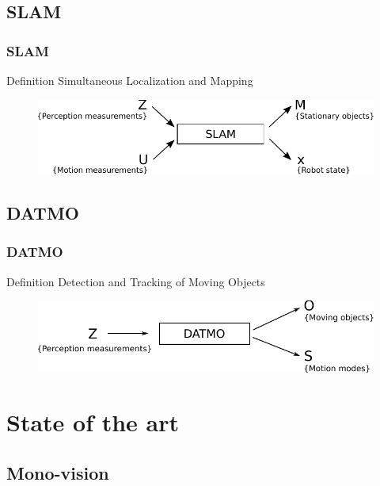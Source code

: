 \documentclass{beamer}
\begin{document}
	\subsection{SLAM}
		\begin{frame}
			\frametitle{SLAM}
			
			\begin{block}{Definition}				
				Simultaneous Localization and Mapping
			\end{block}
			
			\begin{figure}[h]
				\center
				\includegraphics[scale=0.8]{../img/fig:perception:slam}
			 \end{figure}			
			
		\end{frame}
	
	\subsection{DATMO}
		\begin{frame}
			\frametitle{DATMO}
			\begin{block}{Definition}				
				Detection and Tracking of Moving Objects
			\end{block}
			\begin{figure}[h]
				\center
				\includegraphics[scale=0.8]{../img/fig:datmo:process}
			 \end{figure}		
		\end{frame}


\section{State of the art}

\subsection{Mono-vision}
\end{document}
